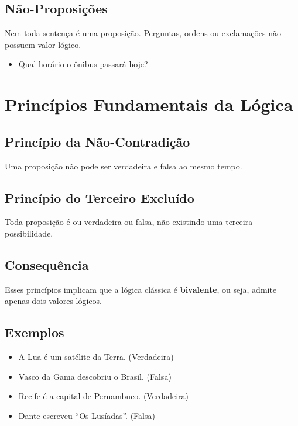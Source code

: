 \subsection{Não-Proposições}

Nem toda sentença é uma proposição. Perguntas, ordens ou exclamações não possuem valor lógico.

\begin{itemize}
    \item Qual horário o ônibus passará hoje?
\end{itemize}

\section{Princípios Fundamentais da Lógica}

\subsection{Princípio da Não-Contradição}

Uma proposição não pode ser verdadeira e falsa ao mesmo tempo.

\subsection{Princípio do Terceiro Excluído}

Toda proposição é ou verdadeira ou falsa, não existindo uma terceira possibilidade.

\subsection{Consequência}

Esses princípios implicam que a lógica clássica é \textbf{bivalente}, ou seja, admite apenas dois valores lógicos.

\subsection{Exemplos}

\begin{itemize}
    \item A Lua é um satélite da Terra. \hfill (Verdadeira)
    \item Vasco da Gama descobriu o Brasil. \hfill (Falsa)
    \item Recife é a capital de Pernambuco. \hfill (Verdadeira)
    \item Dante escreveu ``Os Lusíadas''. \hfill (Falsa)
\end{itemize}

